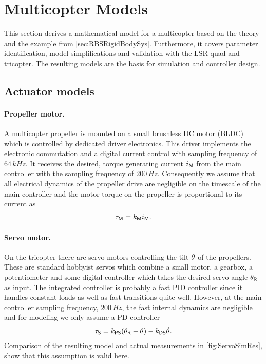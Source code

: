 \section{Multicopter Models}\label{sec:RealizationModels}
This section derives a mathematical model for a multicopter based on the theory and the example from \autoref{sec:RBSRigidBodySys}.
Furthermore, it covers parameter identification, model simplifications and validation with the LSR quad and tricopter.
The resulting models are the basis for simulation and controller design. 

\subsection{Actuator models}

\paragraph{Propeller motor.}
A multicopter propeller is mounted on a small brushless DC motor (BLDC) which is controlled by dedicated driver electronics.
This driver implements the electronic commutation and a digital current control with sampling frequency of $64\,\unit{kHz}$.
It receives the desired, torque generating current $i_{\mathsf{M}}$ from the main controller with the sampling frequency of $200\,\unit{Hz}$. 
Consequently we assume that all electrical dynamics of the propeller drive are negligible on the timescale of the main controller and the motor torque on the propeller is proportional to its current as
\begin{align}
 \tau_{\mathsf{M}} = k_{\mathsf{M}} i_{\mathsf{M}}.
\end{align}

\paragraph{Servo motor.}
On the tricopter there are servo motors controlling the tilt $\theta_{}$ of the propellers.
These are standard hobbyist servos which combine a small motor, a gearbox, a potentiometer and some digital controller which takes the desired servo angle $\theta_{\mathsf{R}}$ as input.
The integrated controller is probably a fast PID controller since it handles constant loads as well as fast transitions quite well.
However, at the main controller sampling frequency, $200\,\unit{Hz}$, the fast internal dynamics are negligible and for modeling we only assume a PD controller
\begin{align}
 \tau_{\mathsf{S}} = k_{\mathsf{PS}} (\theta_{\mathsf{R}} - \theta_{}) - k_{\mathsf{DS}} \dot{\theta}_{}.
\end{align}
Comparison of the resulting model and actual measurements in \autoref{fig:ServoSimRes}, show that this assumption is valid here.

